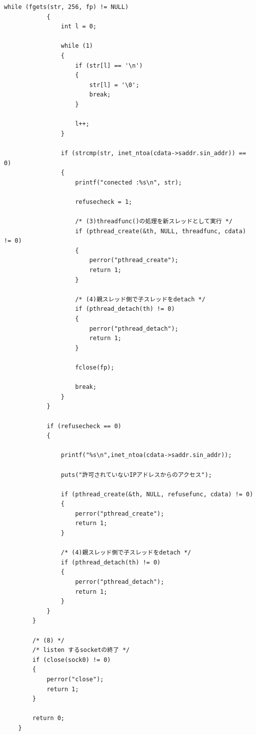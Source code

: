 \documentclass[dvipdfmx,autodetect-engine,titlepage]{jsarticle}
\begin{document}
\begin{lstlisting}[caption=server,label=server.c]
            while (fgets(str, 256, fp) != NULL)
            {
                int l = 0;
    
                while (1)
                {
                    if (str[l] == '\n')
                    {
                        str[l] = '\0';
                        break;
                    }
    
                    l++;
                }
    
                if (strcmp(str, inet_ntoa(cdata->saddr.sin_addr)) == 0)
                {
                    printf("conected :%s\n", str);
    
                    refusecheck = 1;
    
                    /* (3)threadfunc()の処理を新スレッドとして実行 */
                    if (pthread_create(&th, NULL, threadfunc, cdata) != 0)
                    {
                        perror("pthread_create");
                        return 1;
                    }
    
                    /* (4)親スレッド側で子スレッドをdetach */
                    if (pthread_detach(th) != 0)
                    {
                        perror("pthread_detach");
                        return 1;
                    }
    
                    fclose(fp);
    
                    break;
                }
            }
    
            if (refusecheck == 0)
            {
                
                printf("%s\n",inet_ntoa(cdata->saddr.sin_addr));
    
                puts("許可されていないIPアドレスからのアクセス");
    
                if (pthread_create(&th, NULL, refusefunc, cdata) != 0)
                {
                    perror("pthread_create");
                    return 1;
                }
    
                /* (4)親スレッド側で子スレッドをdetach */
                if (pthread_detach(th) != 0)
                {
                    perror("pthread_detach");
                    return 1;
                }
            }
        }
    
        /* (8) */
        /* listen するsocketの終了 */
        if (close(sock0) != 0)
        {
            perror("close");
            return 1;
        }
    
        return 0;
    }
    
    
    
\end{lstlisting}
\end{document}
